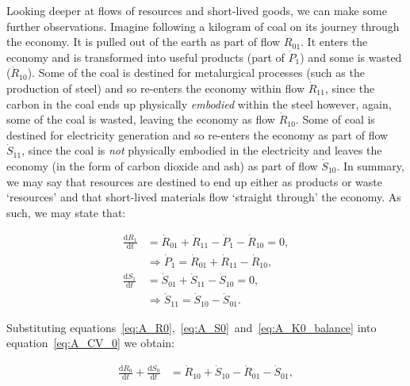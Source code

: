 Looking deeper at flows of resources and short-lived goods,
we can make some further observations. 
Imagine following a kilogram of coal on its journey
through the economy. It is pulled out of the earth as part
of flow $\dot{R}_{01}$. 
It enters the economy and is transformed into useful
products (part of $\dot{P}_{1}$) and some is wasted ($\dot{R}_{10}$).
Some of the coal is destined for metalurgical processes 
(such as the production of steel)
and so re-enters the economy within flow $\dot{R}_{11}$,
since the carbon in the coal ends up physically
\emph{embodied} within the steel however,
again,
some of the coal is wasted,
leaving the economy as flow $\dot{R}_{10}$. 
Some of coal is destined for electricity generation
and so re-enters the economy as part of flow $\dot{S}_{11}$,
since the coal is \emph{not} physically embodied
in the electricity and leaves the economy
(in the form of carbon dioxide and ash)
as part of flow $\dot{S}_{10}$.
In summary, we may say that resources are destined
to end up either as products or waste `resources'
and that short-lived materials flow `straight through'
the economy. 
As such,
we may state that:

\begin{align}
	\frac{\mathrm{d}R_1}{\mathrm{d}t}		&
	= \dot{R}_{01}
	+ \dot{R}_{11}
	- \dot{P}_{1}
	- \dot{R}_{10}
	= 0,										\nonumber	\\
\label{eq:A_P1a}
																	&
	\Longrightarrow 										
	\dot{P}_{1}
	= \dot{R}_{01}
	+ \dot{R}_{11}
	- \dot{R}_{10}	,										\\									
\label{eq:A_S1_balance}
	\frac{\mathrm{d}S_1}{\mathrm{d}t}		&
	= \dot{S}_{01}
	+ \dot{S}_{11}
	- \dot{S}_{10}
	= 0,															\\
\label{eq:A_S11}
																	&
	\Longrightarrow 										
	\dot{S}_{11}
	= \dot{S}_{10}
	- \dot{S}_{01}.
\end{align}



Substituting equations~\ref{eq:A_R0},~\ref{eq:A_S0}~and~\ref{eq:A_K0_balance}
into equation~\ref{eq:A_CV_0} we obtain:

\begin{align}\label{eq:A_CV_0a}
	\frac{\mathrm{d}R_0}{\mathrm{d}t}		
	+	\frac{\mathrm{d}S_0}{\mathrm{d}t}		&	
	=	\dot{R}_{10}		
	+	\dot{S}_{10}	
	-	\dot{R}_{01}											
	-	\dot{S}_{01},							%
\end{align}






